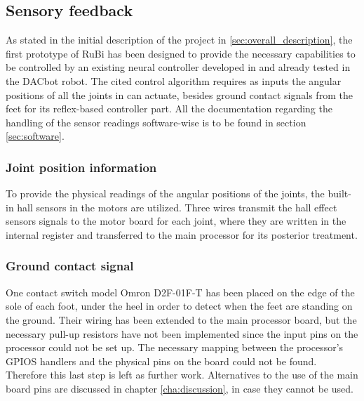 
\subsection{Sensory feedback} %
\label{sub:sensory_feedback}
As stated in the initial description of the project in \ref{sec:overall_description}, the first prototype of RuBi has been designed to provide the necessary capabilities to be controlled by an existing neural controller developed in \cite{dacbot1} and already tested in the DACbot robot.
The cited control algorithm requires as inputs the angular positions of all the joints in can actuate, besides ground contact signals from the feet for its reflex-based controller part.
All the documentation regarding the handling of the sensor readings software-wise is to be found in section \ref{sec:software}.


\subsubsection{Joint position information} %
\label{ssub:joint_position_feedback}
To provide the physical readings of the angular positions of the joints, the built-in hall sensors in the motors are utilized. 
Three wires transmit the hall effect sensors signals to the motor board for each joint, where they are written in the internal register and transferred to the main processor for its posterior treatment.

\subsubsection{Ground contact signal} %
\label{ssub:ground_contact_feedback}
One contact switch model Omron D2F-01F-T has been placed on the edge of the sole of each foot, under the heel in order to detect when the feet are standing on the ground. 
Their wiring has been extended to the main processor board, but the necessary pull-up resistors have not been implemented since the input pins on the processor could not be set up.
The necessary mapping between the processor's GPIOS handlers and the physical pins on the board could not be found.
Therefore this last step is left as further work.
Alternatives to the use of the main board pins are discussed in chapter \ref{cha:discussion}, in case they cannot be used.

